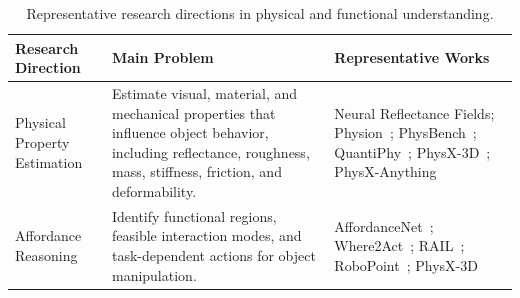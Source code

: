 \documentclass{SCIS2026}
\renewcommand{\arraystretch}{1.45}
\begin{document}
\begin{table}[t]
\centering

\caption{Representative research directions in physical and
functional understanding.}

\label{tab:physical_functional_overview}

\footnotesize
\renewcommand{\arraystretch}{1.45}
\setlength{\tabcolsep}{6pt}

\begin{tabularx}{\textwidth}{
    L{0.21\textwidth}
    L{0.45\textwidth}
    Y
}



\textcolor{HeaderText}{\textbf{Research Direction}}
&
\textcolor{HeaderText}{\textbf{Main Problem}}
&
\textcolor{HeaderText}{\textbf{Representative Works}}
\\

\midrule


{Physical Property Estimation}
&
Estimate visual, material, and mechanical properties that
influence object behavior, including reflectance, roughness,
mass, stiffness, friction, and deformability.
&
Neural Reflectance Fields;
Physion~\cite{bear2021physion};
PhysBench~\cite{chow2025physbench};
QuantiPhy~\cite{li2025quantiphy};
PhysX-3D~\cite{cao2025physx3d};
PhysX-Anything~\cite{cao2025physxanything}
\\[4pt]


{Affordance Reasoning}
&
Identify functional regions, feasible interaction modes,
and task-dependent actions for object manipulation.
&
AffordanceNet~\cite{do2018affordancenet};
Where2Act~\cite{mo2021where2act};
RAIL~\cite{zhang2024rail};
RoboPoint~\cite{yuan2024robopoint};
PhysX-3D~\cite{cao2025physx3d}
\\[4pt]



\end{tabularx}
\end{table}
\end{document}
